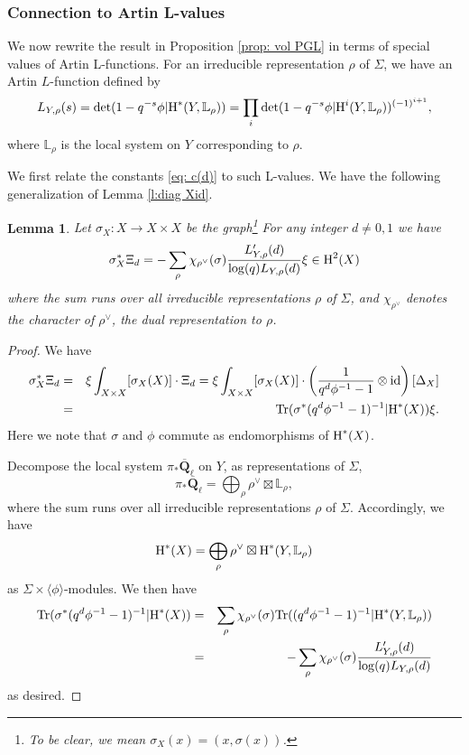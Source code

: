 \documentclass[reqno]{amsart}
\numberwithin{equation}{subsection}
\newtheorem{lemma}[subsubsection]{Lemma}
\theoremstyle{definition}
\def\LL{\mathbb{L}}
\newcommand\id{\textup{id}}
\newcommand{\Ind}{\textup{Ind}}
\newcommand{\Tr}{\textup{Tr}}
\newcommand{\Qlbar}{\overline{\Q}_\ell}
\renewcommand{\j}[1]{\langle{#1}\rangle}
\newcommand\ot{\otimes}
\newcommand{\cohog}[2]{\textup{H}^{#1}({#2})}     %
\newcommand\D\Delta
\newcommand{\s}{\sigma}
\newcommand{\Sig}{\Sigma}
\newcommand{\Q}{\mathbf{Q}}
\begin{document}
\subsubsection{Connection to Artin L-values}
We now rewrite the result in Proposition \ref{prop: vol PGL} in terms of special values of Artin L-functions.
For an irreducible representation $\rho$ of $\Sig$, we have an Artin $L$-function defined by
\begin{eqnarray*}
L_{Y,\rho}(s)=\det(1-q^{-s}\phi| \cohog{*}{Y,\LL_\rho} )  = \prod_i \det(1-q^{-s}\phi| \cohog{i}{Y,\LL_\rho} )^{(-1)^{i+1}} ,
\end{eqnarray*}
where $\LL_\rho$ is the local system on $Y$ corresponding to $\rho$. 

We first relate the constants \eqref{eq: c(d)} to such L-values. We have the following generalization of Lemma \ref{l:diag Xid}.
\begin{lemma}\label{l: X s} 
Let $\s_X:X\to X\times X$ be the graph\footnote{To be clear, we mean $\s_X(x)=(x,\s(x))$.} For any integer $d\ne0,1$ we have 
\begin{eqnarray*}
\s_X ^*\Xi_d=-\sum_{\rho} \chi_{\rho^\vee}(\s)\frac{L'_{Y,\rho}(d)}{\log(q)L_{Y,\rho}(d)}\xi \in \cohog{2}{X}
\end{eqnarray*}
where the sum runs over all irreducible representations $\rho$ of $\Sig$, and $ \chi_{\rho^\vee}$ denotes the character of $\rho^\vee$, the dual representation to $\rho$.
\end{lemma}
\begin{proof}
We have
\begin{eqnarray*}
    \s_X ^*\Xi_d&=&\xi\int_{X\times X}[\s_X(X)]\cdot \Xi_d=\xi\int_{X\times X}[\s_X(X)]\cdot \left(\frac{1}{q^d\phi^{-1}-1}\ot\id\right)[\D_X]\\
    &=&\Tr(\s^* (q^d\phi^{-1}-1)^{-1}|\cohog{*}{X})\xi.
\end{eqnarray*}
Here we note that $\s$ and $\phi$ commute as endomorphisms of $\cohog{*}{X}$.

Decompose the local system $\pi_\ast\Qlbar$ on $Y$, as representations of $\Sig$, 
$$
\pi_\ast\Qlbar=\bigoplus_{\rho} \rho^\vee\boxtimes\LL_\rho,
$$ where the sum runs over all irreducible representations $\rho$ of $\Sig$.
Accordingly, we have
$$
\cohog{*}{X}=\bigoplus_{\rho}\rho^\vee\boxtimes \cohog{*}{Y,\LL_\rho} 
$$
as $\Sig\times \j{\phi}$-modules.
We then have
\begin{eqnarray*}
\Tr(\s^*(q^d\phi^{-1}-1)^{-1}|\cohog{*}{X})&=&\sum_{\rho} \chi_{\rho^\vee}(\s)\Tr((q^d\phi^{-1}-1)^{-1}|\cohog{*}{Y,\LL_\rho}) \\
&=&-\sum_{\rho} \chi_{\rho^\vee}(\s)\frac{L'_{Y,\rho}(d)}{\log(q)L_{Y,\rho}(d)}
\end{eqnarray*}
as desired.


\end{proof}
\end{document}

